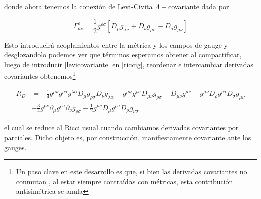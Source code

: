 \documentclass{article}
\numberwithin{equation}{section}
\begin{document}
donde ahora tenemos la conexión de Levi-Civita $ \Lambda-$covariante dada por 

\begin{equation}\label{levicovariante}
\Gamma^{\rho}_{\mu \nu} = \frac{1}{2} g^{\rho \sigma}\left[ D_{\mu} g_{\sigma \nu} + D_{\nu} g_{\mu \sigma} - D_{\sigma} g_{\mu \nu}\right]
\end{equation}

Esto introducirá acoplamientos entre la métrica y los campos de gauge y desglozandolo podemos ver que términos esperamos obtener al compactificar, luego de introducir \ref{levicovariante} en \ref{riccig}, reordenar e intercambiar derivadas covariantes obtenemos\footnote{ Un paso clave en este desarrollo es que, si bien las derivadas covariantes no conmutan , al estar siempre contraídas con métricas, esta contribución antisimétrica se anula}


\begin{equation}\label{Rcov}
\begin{aligned}
R_D&= - \frac{1}{4}g^{\mu \nu} g^{\rho \sigma} g^{\lambda \alpha} D_{\mu}{g_{\rho \sigma}} D_{\nu}{g_{\lambda \alpha}} -g^{\mu \nu} g^{\rho \sigma} D_{\mu \nu}{g_{\rho \sigma}} - D_{\mu \nu} g^{\mu \nu} - g^{\mu \nu} D_{\rho}{g^{\rho \sigma}} D_{\sigma}{g_{\mu \nu}}\\
&-\frac{3}{4}g^{\mu \nu} \partial_{\mu}{g^{\rho \sigma}} \partial_{\nu}{g_{\rho \sigma}} - \frac{1}{2} g^{\mu \nu}D_{\mu}{g^{\rho \sigma}} D_{\rho}{g_{\nu \sigma}} 
\end{aligned}
\end{equation}

el cual se reduce al Ricci usual cuando cambiamos derivadas covariantes por parciales. Dicho objeto es, por construcción, manifiestamente covariante ante los gauges.\\
\end{document}
